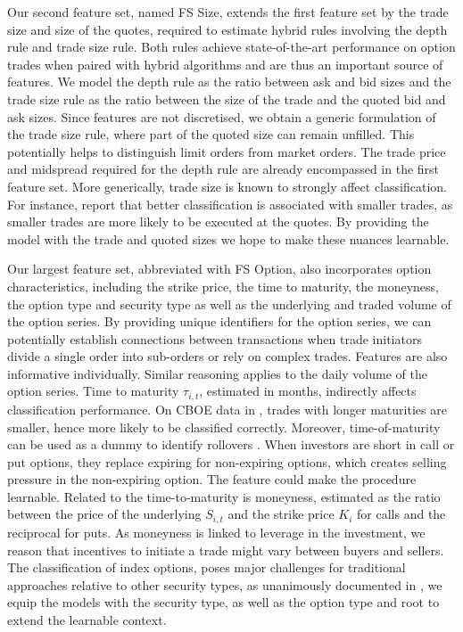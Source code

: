 Our second feature set, named \gls{FS} Size, extends the first feature set by the trade size and size of the quotes, required to estimate hybrid rules involving the depth rule and trade size rule. Both rules achieve state-of-the-art performance on option trades when paired with hybrid algorithms and are thus an important source of features. We model the depth rule as the ratio between ask and bid sizes and the trade size rule as the ratio between the size of the trade and the quoted bid and ask sizes. Since features are not discretised, we obtain a generic formulation of the trade size rule, where part of the quoted size can remain unfilled. This potentially helps to distinguish limit orders from market orders. The trade price and midspread required for the depth rule are already encompassed in the first feature set. More generically, trade size is known to strongly affect classification. For instance, \textcites[][889]{savickasInferringDirectionOption2003}[][537]{ellisAccuracyTradeClassification2000} report that better classification is associated with smaller trades, as smaller trades are more likely to be executed at the quotes. By providing the model with the trade and quoted sizes we hope to make these nuances learnable.

Our largest feature set, abbreviated with \gls{FS} Option, also incorporates option characteristics, including the strike price, the time to maturity, the moneyness, the option type and security type as well as the underlying and traded volume of the option series. By providing unique identifiers for the option series, we can potentially establish connections between transactions when trade initiators divide a single order into sub-orders or rely on complex trades. Features are also informative individually. Similar reasoning applies to the daily volume of the option series. Time to maturity $\tau_{i,t}$, estimated in months, indirectly affects classification performance. On \gls{CBOE} data in \textcite[][889]{savickasInferringDirectionOption2003}, trades with longer maturities are smaller, hence more likely to be classified correctly. Moreover, time-of-maturity can be used as a dummy to identify rollovers \autocite[][700]{muravyevOrderFlowExpected2016}. When investors are short in call or put options, they replace expiring for non-expiring options, which creates selling pressure in the non-expiring option. The feature could make the procedure learnable. Related to the time-to-maturity is moneyness, estimated as the ratio between the price of the underlying $S_{i,t}$ and the strike price $K_{i}$ for calls and the reciprocal for puts. As moneyness is linked to leverage in the investment, we reason that incentives to initiate a trade might vary between buyers and sellers. The classification of index options, poses major challenges for traditional approaches relative to other security types, as unanimously documented in \textcites[][22]{grauerOptionTradeClassification2022}[][898-899]{savickasInferringDirectionOption2003}, we equip the models with the security type, as well as the option type and root to extend the learnable context.

